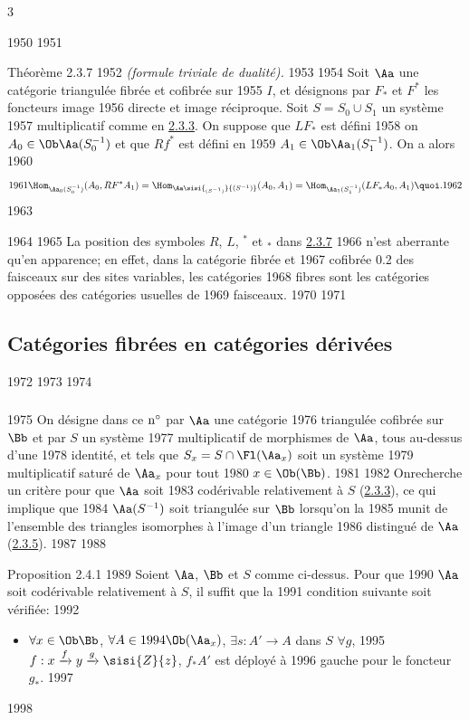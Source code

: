 3	\documentclass[10pt]{../fichiers-configuration-latex/smfart}
\begin{document}
  1950	
  1951	\begin{enonce*}{Théorème 2.3.7}
  1952	\emph{(formule triviale de dualité).}
  1953	
  1954	Soit $\Aa$ une catégorie triangulée fibrée et cofibrée sur
  1955	$I$, et désignons par $F_{\ast}$ et $F^{\ast}$ les foncteurs image
  1956	directe et image réciproque. Soit $S=S_0\cup S_1$ un système
  1957	multiplicatif comme en \hyperref[XVII.def2.3.3]{2.3.3}. On suppose que $LF_{\ast}$ est défini
  1958	on $A_0\in \Ob \Aa(S^{-1}_0)$ et que $Rf^{\ast}$ est défini en
  1959	$A_1\in \Ob\Aa_1(S^{-1}_1)$. On a alors
  1960	\[
  1961	\Hom_{\Aa_0(S^{-1}_0)}(A_0,RF^{\ast}A_1)=\Hom_{\Aa\sisi{_{(S^{-1})}}{(S^{-1})}}(A_0,A_1)=\Hom_{\Aa_1(S^{-1}_1)}(LF_{\ast}A_0,A_1){\quoi}.
  1962	\]
  1963	\end{enonce*}
  1964	
  1965	La position des symboles $R$, $L$, ${}^\ast$ et ${}_{\ast}$ dans \hyperref[XVII.thm2.3.7]{2.3.7}
  1966	n'est aberrante qu'en apparence; en effet, dans la catégorie fibrée et
  1967	cofibrée 0.2 des faisceaux sur des sites variables, les catégories
  1968	fibres sont les catégories opposées des catégories usuelles de
  1969	faisceaux.
  1970	
  1971	\subsection{Catégories fibrées en catégories dérivées}
  1972	
  1973	\setcounter{subsubsection}{-1}
  1974	\subsubsection{}
  1975	On désigne dans ce ${\rm n^{\circ}}$ par $\Aa$ une catégorie
  1976	triangulée cofibrée sur $\Bb$ et par $S$ un système
  1977	multiplicatif de morphismes de $\Aa$, tous au-dessus d'une
  1978	identité, et tels que $S_x=S\cap \Fl(\Aa_x)$ soit un système
  1979	multiplicatif saturé de $\Aa_x$ \cite[1.2.1]{CD} pour tout
  1980	$x\in \Ob (\Bb)$.
  1981	
  1982	On\pageoriginale recherche un critère pour que $\Aa$ soit
  1983	codérivable relativement à $S$ (\hyperref[XVII.def2.3.3]{2.3.3}), ce qui implique que
  1984	$\Aa(S^{-1})$ soit triangulée sur $\Bb$ lorsqu'on la
  1985	munit de l'ensemble des triangles isomorphes à l'image d'un triangle
  1986	distingué de $\Aa$ (\hyperref[XVII.prop2.3.5]{2.3.5}).
  1987	
  1988	\begin{enonce*}{Proposition 2.4.1}
  1989	Soient $\Aa$, $\Bb$ et $S$ comme ci-dessus. Pour que
  1990	$\Aa$ soit codérivable relativement à $S$, il suffit que la
  1991	condition suivante soit vérifiée:
  1992	\begin{itemize}
  1993	\item[$(\ast)$] $\forall x \in \Ob\Bb$, $\forall A\in
  1994	\Ob(\Aa_x)$, $\exists s:A'\rightarrow A$ dans $S$\sisi{}{,} $\forall g$,
  1995	$f:x\xrightarrow{f}y\xrightarrow{g}\sisi{Z}{z}$, $f_{\ast}A'$ est déployé à
  1996	gauche pour le foncteur $g_{\ast}$.
  1997	\end{itemize}
  1998	\end{enonce*}
\end{document}
